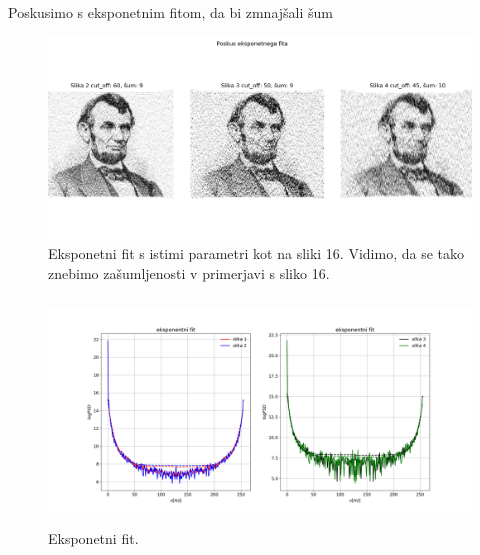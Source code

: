 \documentclass[11pt, a4paper]{article}
\begin{document}
Poskusimo s eksponetnim fitom, da bi zmnajšali šum 
\begin{figure}[H]

\includegraphics[width=16cm, ]{tretja_tretji4.png}
\caption{Eksponetni fit s istimi parametri kot na sliki 16. Vidimo, da se tako znebimo zašumljenosti v primerjavi s sliko 16. }  
\end{figure}

\begin{figure}[H]

\includegraphics[width=18cm, height=6cm]{tretja_tretji3.png}

\caption{Eksponetni fit. }  
\end{figure}
\end{document}
